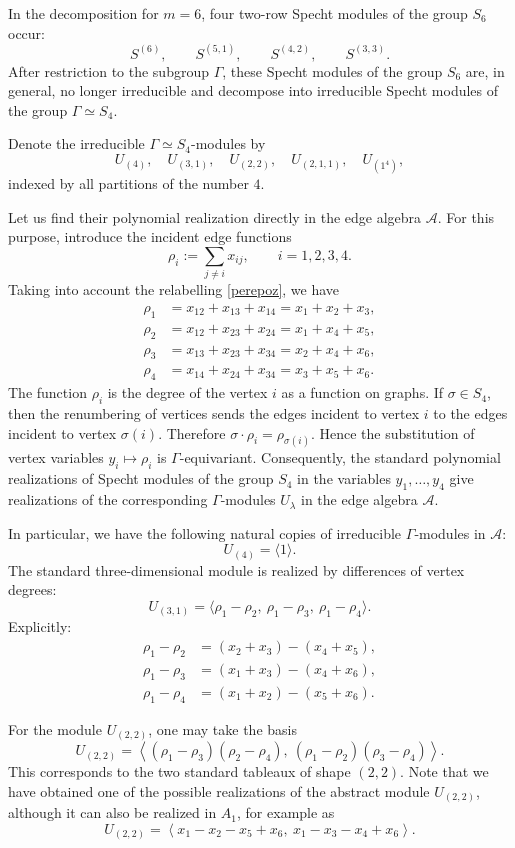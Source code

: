 \documentclass[12pt,reqno]{amsart}
\begin{document}
In the decomposition for $m=6$, four two-row Specht modules of the group
$S_6$ occur:
$$
S^{(6)},\qquad S^{(5,1)},\qquad S^{(4,2)},\qquad S^{(3,3)}.
$$
After restriction to the subgroup $\Gamma$, these Specht modules of the group
$S_6$ are, in general, no longer irreducible and decompose into irreducible
Specht modules of the group $\Gamma\simeq S_4$.

Denote the irreducible $\Gamma\simeq S_4$-modules by
$$
U_{(4)},\quad U_{(3,1)},\quad U_{(2,2)},\quad U_{(2,1,1)},\quad U_{(1^4)},
$$
indexed by all partitions of the number $4$.

Let us find their polynomial realization directly in the edge algebra
$\mathcal A$. For this purpose, introduce the incident edge functions
$$
\rho_i:=\sum_{j\ne i}x_{ij},
\qquad i=1,2,3,4.
$$
Taking into account the relabelling \eqref{perepoz}, we have
$$
\begin{aligned}
\rho_1&=x_{12}+x_{13}+x_{14}=x_1+x_2+x_3,\\
\rho_2&=x_{12}+x_{23}+x_{24}=x_1+x_4+x_5,\\
\rho_3&=x_{13}+x_{23}+x_{34}=x_2+x_4+x_6,\\
\rho_4&=x_{14}+x_{24}+x_{34}=x_3+x_5+x_6.
\end{aligned}
$$
The function $\rho_i$ is the degree of the vertex $i$ as a function on
graphs. If $\sigma\in S_4$, then the renumbering of vertices sends the edges
incident to vertex $i$ to the edges incident to vertex $\sigma(i)$. Therefore
$
\sigma\cdot \rho_i=\rho_{\sigma(i)}.
$
Hence the substitution of vertex variables
$
y_i\mapsto \rho_i
$
is $\Gamma$-equivariant. Consequently, the standard polynomial realizations
of Specht modules of the group $S_4$ in the variables $y_1,\dots,y_4$ give
realizations of the corresponding $\Gamma$-modules $U_\lambda$ in the edge
algebra $\mathcal A$.

In particular, we have the following natural copies of irreducible
$\Gamma$-modules in $\mathcal A$:
$$
U_{(4)}=\langle 1\rangle.
$$
The standard three-dimensional module is realized by differences of vertex
degrees:
$$
U_{(3,1)}
=
\langle
\rho_1-\rho_2,\ \rho_1-\rho_3,\ \rho_1-\rho_4
\rangle.
$$
Explicitly:
$$
\begin{aligned}
\rho_1-\rho_2&=(x_2+x_3)-(x_4+x_5),\\
\rho_1-\rho_3&=(x_1+x_3)-(x_4+x_6),\\
\rho_1-\rho_4&=(x_1+x_2)-(x_5+x_6).
\end{aligned}
$$

For the module $U_{(2,2)}$, one may take the basis
$$
U_{(2,2)}
=
\left\langle
(\rho_1-\rho_3)(\rho_2-\rho_4),\
(\rho_1-\rho_2)(\rho_3-\rho_4)
\right\rangle.
$$
This corresponds to the two standard tableaux of shape $(2,2)$. Note that we
have obtained one of the possible realizations of the abstract module
$U_{(2,2)}$, although it can also be realized in $A_1$, for example as
$$
U_{(2,2)}=\left\langle
x_1-x_2-x_5+x_6,\ 
x_1-x_3-x_4+x_6
\right\rangle.
$$
\end{document}
